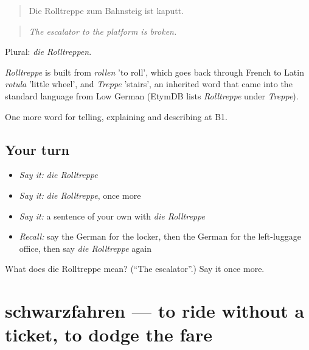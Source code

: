 \begin{quote}
Die Rolltreppe zum Bahnsteig ist kaputt.
\end{quote}

\begin{quote}
\emph{The escalator to the platform is broken.}
\end{quote}

Plural: \emph{die Rolltreppen}.

\begin{cousinweb}
\emph{Rolltreppe} is built from \emph{rollen} 'to roll', which goes back through French to Latin \emph{rotula} 'little wheel', and \emph{Treppe} 'stairs', an inherited word that came into the standard language from Low German (EtymDB lists \emph{Rolltreppe} under \emph{Treppe}).
\end{cousinweb}

\begin{grammarlens}[title={What you've built}]
One more word for telling, explaining and describing at B1.
\end{grammarlens}

\subsection*{Your turn}
\begin{itemize}
\raggedright
  \item \emph{Say it:} \emph{die Rolltreppe}
  \item \emph{Say it:} \emph{die Rolltreppe}, once more
  \item \emph{Say it:} a sentence of your own with \emph{die Rolltreppe}
  \item \emph{Recall:} say the German for the locker, then the German for the left-luggage office, then say \emph{die Rolltreppe} again
\end{itemize}

\begin{tcolorbox}[breakable,colback=teal!4,colframe=teal!35!black,title={Before you move on}]
What does die Rolltreppe mean? (\textquotedblleft{}The escalator\textquotedblright{}.) Say it once more.
\end{tcolorbox}
\section[schwarzfahren]{schwarzfahren — to ride without a ticket, to dodge the fare}

\label{lesson:GE-C415-schwarzfahren}



